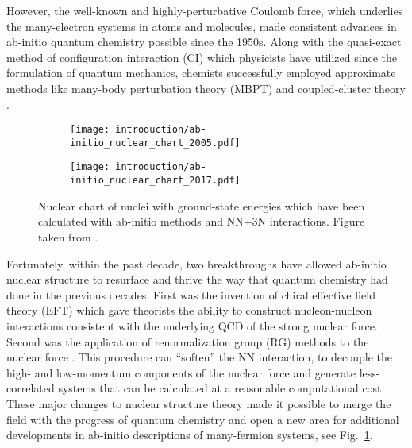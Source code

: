 \documentclass[../thesis.tex]{subfiles}
\begin{document}
However, the well-known and highly-perturbative Coulomb force, which underlies the many-electron systems in atoms and molecules, made consistent advances in ab-initio quantum chemistry possible since the 1950s.  Along with the quasi-exact method of configuration interaction (CI) \cite{SLATER19291293,CONDON19301121,BACHER1933264,UFFORD1933732} which physicists have utilized since the formulation of quantum mechanics, chemists successfully employed approximate methods like many-body perturbation theory (MBPT) \cite{HUBBARD1957539,HUGENHOLTZ1957481,SCHAEFER1984,SHAVITT2009} and coupled-cluster theory \cite{CIZEK19664256,CIZEK1971359,CIZEK1980251,PIECUCH2002527,SHAVITT2009}.

\begin{figure}[h]
  \centering
  \begin{subfigure}{0.7\textwidth}
    \centering
    \texttt{[image: introduction/ab-initio\_nuclear\_chart\_2005.pdf]}
  \end{subfigure}
  
  \begin{subfigure}{0.7\textwidth}
    \centering
    \texttt{[image: introduction/ab-initio\_nuclear\_chart\_2017.pdf]}
  \end{subfigure}
  \caption{Nuclear chart of nuclei with ground-state energies which have been calculated with ab-initio methods and NN+3N interactions.  Figure taken from \cite{HERGERTPRIVATE}.}
  \label{fig:AbInitioChart}
\end{figure}

Fortunately, within the past decade, two breakthroughs have allowed ab-initio nuclear structure to resurface and thrive the way that quantum chemistry had done in the previous decades.  First was the invention of chiral effective field theory (EFT) \cite{EPELBAUM20091773,MACHLEIDT20111} which gave theorists the ability to construct nucleon-nucleon interactions consistent with the underlying QCD of the strong nuclear force.  Second was the application of renormalization group (RG) methods to the nuclear force \cite{BOGNER201094,ROTH2011072501}.  This procedure can ``soften'' the NN interaction, to decouple the high- and low-momentum components of the nuclear force and generate less-correlated systems that can be calculated at a reasonable computational cost.  These major changes to nuclear structure theory made it possible to merge the field with the progress of quantum chemistry and open a new area for additional developments in ab-initio descriptions of many-fermion systems, see Fig.\ \ref{fig:AbInitioChart}.
\end{document}
